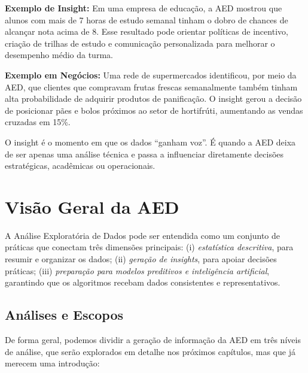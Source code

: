 \begin{NoteBox}
\textbf{Exemplo de Insight:}  
Em uma empresa de educação, a AED mostrou que alunos com mais de 7 horas de estudo semanal tinham o dobro de chances de alcançar nota acima de 8. Esse resultado pode orientar políticas de incentivo, criação de trilhas de estudo e comunicação personalizada para melhorar o desempenho médio da turma.

\medskip

\textbf{Exemplo em Negócios:}  
Uma rede de supermercados identificou, por meio da AED, que clientes que compravam frutas frescas semanalmente também tinham alta probabilidade de adquirir produtos de panificação. O insight gerou a decisão de posicionar pães e bolos próximos ao setor de hortifrúti, aumentando as vendas cruzadas em 15\%.
\end{NoteBox}

O insight é o momento em que os dados “ganham voz”. É quando a AED deixa de ser apenas uma análise técnica e passa a influenciar diretamente decisões estratégicas, acadêmicas ou operacionais.


\section{Visão Geral da AED}

A Análise Exploratória de Dados pode ser entendida como um conjunto de práticas que conectam três dimensões principais:  
(i) \textit{estatística descritiva}, para resumir e organizar os dados;  
(ii) \textit{geração de insights}, para apoiar decisões práticas;  
(iii) \textit{preparação para modelos preditivos e inteligência artificial}, garantindo que os algoritmos recebam dados consistentes e representativos.

\subsection*{Análises e Escopos}
De forma geral, podemos dividir a geração de informação da AED em três níveis de análise, que serão explorados em detalhe nos próximos capítulos, mas que já merecem uma introdução:

